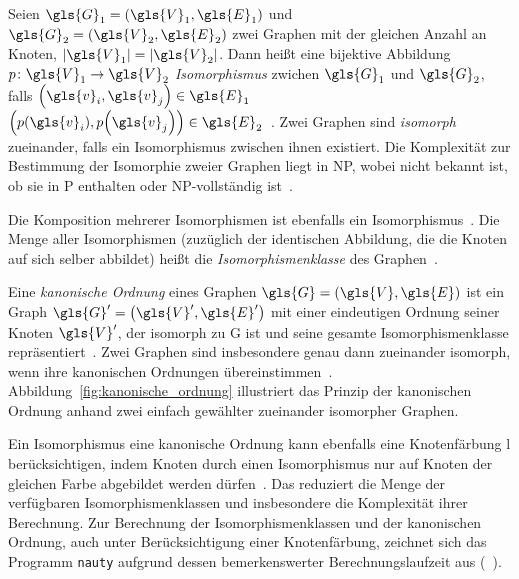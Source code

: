 Seien $\gls{G}_1 = \left(\gls{V}_1, \gls{E}_1\right)$ und $\gls{G}_2 = \left(\gls{V}_2, \gls{E}_2\right)$ zwei Graphen mit der gleichen Anzahl an Knoten, \dhe{} $\left|\gls{V}_1\right| = \left|\gls{V}_2\right|$.
Dann heißt eine bijektive Abbildung $p \colon \gls{V}_1 \to \gls{V}_2$ \emph{Isomorphismus} zwichen $\gls{G}_1$ und $\gls{G}_2$, falls $\left(\gls{v}_i, \gls{v}_j\right) \in \gls{E}_1$ \gdw{} $\left(p\left(\gls{v}_i\right), p\left(\gls{v}_j\right)\right) \in \gls{E}_2$~\cite{nauty}.
Zwei Graphen sind \emph{isomorph} zueinander, falls ein Isomorphismus zwischen ihnen existiert.
Die Komplexität zur Bestimmung der Isomorphie zweier Graphen liegt in NP, wobei nicht bekannt ist, ob sie in P enthalten oder NP-vollständig ist~\cite{patchy}.

Die Komposition mehrerer Isomorphismen ist ebenfalls ein Isomorphismus~\cite{nauty}.
Die Menge aller Isomorphismen (zuzüglich der identischen Abbildung, die die Knoten auf sich selber abbildet) heißt die \emph{Isomorphismenklasse} des Graphen~\cite{nauty}.

Eine \emph{kanonische Ordnung} eines Graphen $\gls{G} = \left(\gls{V}, \gls{E}\right)$ ist ein Graph $\gls{G}^{\prime} = \left(\gls{V}^{\prime}, \gls{E}^{\prime}\right)$ mit einer eindeutigen Ordnung seiner Knoten $\gls{V}^{\prime}$, der isomorph zu \gls{G} ist und seine gesamte Isomorphismenklasse repräsentiert~\cite{patchy}.
Zwei Graphen sind insbesondere genau dann zueinander isomorph, wenn ihre kanonischen Ordnungen übereinstimmen~\cite{nauty}.
Abbildung~\ref{fig:kanonische_ordnung} illustriert das Prinzip der kanonischen Ordnung anhand zwei einfach gewählter zueinander isomorpher Graphen.


Ein Isomorphismus \bzw{} eine kanonische Ordnung kann ebenfalls eine Knotenfärbung \gls{l} berücksichtigen, indem Knoten durch einen Isomorphismus nur auf Knoten der gleichen Farbe abgebildet werden dürfen~\cite{nauty}.
Das reduziert die Menge der verfügbaren Isomorphismenklassen und insbesondere die Komplexität ihrer Berechnung.
Zur Berechnung der Isomorphismenklassen und der kanonischen Ordnung, auch unter Berücksichtigung einer Knotenfärbung, zeichnet sich das Programm \texttt{nauty} aufgrund dessen bemerkenswerter Berechnungslaufzeit aus (\vgl{}~\cite{nauty}).
